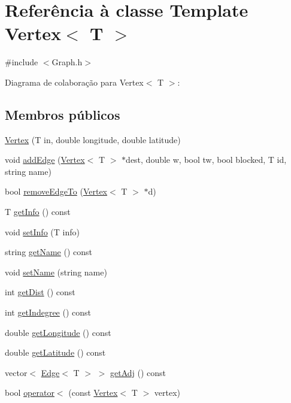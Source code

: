 \hypertarget{class_vertex}{}\section{Referência à classe Template Vertex$<$ T $>$}
\label{class_vertex}


{\ttfamily \#include $<$Graph.\+h$>$}



Diagrama de colaboração para Vertex$<$ T $>$\+:
\subsection*{Membros públicos}
\begin{DoxyCompactItemize}
\item 
\hyperlink{class_vertex_a32481367e36d2162714bc411f31b5f8f}{Vertex} (T in, double longitude, double latitude)
\item 
void \hyperlink{class_vertex_a40b147df89a89885a06fd9c3912c6dd5}{add\+Edge} (\hyperlink{class_vertex}{Vertex}$<$ T $>$ $\ast$dest, double w, bool tw, bool blocked, T id, string name)
\item 
bool \hyperlink{class_vertex_ab2b5b43fb1709a901b78718436763a84}{remove\+Edge\+To} (\hyperlink{class_vertex}{Vertex}$<$ T $>$ $\ast$d)
\item 
T \hyperlink{class_vertex_a5880b4b252ae6818819c2f9645784b59}{get\+Info} () const 
\item 
void \hyperlink{class_vertex_a31cd60c26640f8072a928ba70eb2f95e}{set\+Info} (T info)
\item 
string \hyperlink{class_vertex_a878c08e3eca2b53b173fa8c1fa77227d}{get\+Name} () const 
\item 
void \hyperlink{class_vertex_aee1d15f2efc9c7baecff72265beb1acf}{set\+Name} (string name)
\item 
int \hyperlink{class_vertex_a3379c6cbcf1eaacc098381e3557a0b52}{get\+Dist} () const 
\item 
int \hyperlink{class_vertex_a305ef01582f945f22134abb9294fe1f3}{get\+Indegree} () const 
\item 
double \hyperlink{class_vertex_aa88dbd3c9af86b1fd567a43c0da69017}{get\+Longitude} () const 
\item 
double \hyperlink{class_vertex_afbf6474fe17f4fd509bda1026fd81385}{get\+Latitude} () const 
\item 
vector$<$ \hyperlink{class_edge}{Edge}$<$ T $>$ $>$ \hyperlink{class_vertex_a4d8021f4861cc4195af3ecf042a015cc}{get\+Adj} () const 
\item 
bool \hyperlink{class_vertex_a7091b26f281a5041b1775a3d3f9cb7a6}{operator$<$} (const \hyperlink{class_vertex}{Vertex}$<$ T $>$ vertex)
\end{DoxyCompactItemize}

